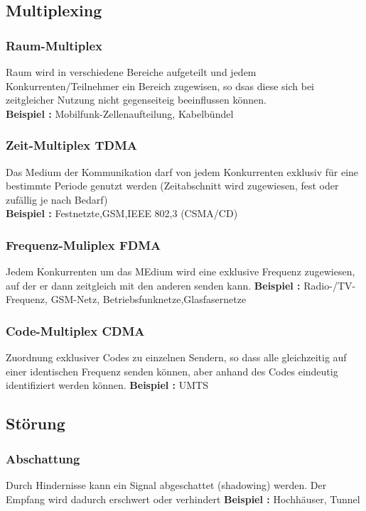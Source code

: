 \subsection{Multiplexing}
\subsubsection{Raum-Multiplex}
Raum wird in verschiedene Bereiche aufgeteilt und jedem Konkurrenten/Teilnehmer ein Bereich zugewisen, so dsas diese sich bei zeitgleicher Nutzung nicht gegenseiteig beeinflussen können. \\
\textbf{Beispiel :} Mobilfunk-Zellenaufteilung, Kabelbündel

\subsubsection{Zeit-Multiplex TDMA}
Das Medium der Kommunikation darf von jedem Konkurrenten exklusiv für eine bestimmte Periode genutzt werden (Zeitabschnitt wird zugewiesen, fest oder zufällig je nach Bedarf) \\
\textbf{Beispiel :} Festnetzte,GSM,IEEE 802,3 (CSMA/CD)

\subsubsection{Frequenz-Muliplex FDMA}
Jedem Konkurrenten um das MEdium wird eine exklusive Frequenz zugewiesen, auf der er dann zeitgleich mit den anderen senden kann.
\textbf{Beispiel :} Radio-/TV-Frequenz, GSM-Netz, Betriebsfunknetze,Glasfasernetze

\subsubsection{Code-Multiplex CDMA}
Zuordnung exklusiver Codes zu einzelnen Sendern, so dass alle gleichzeitig auf einer identischen Frequenz senden können, aber anhand des Codes eindeutig identifiziert werden können.
\textbf{Beispiel :} UMTS

\subsection{Störung}
\subsubsection{Abschattung}
Durch Hindernisse kann ein Signal abgeschattet (shadowing) werden. Der Empfang wird dadurch erschwert oder verhindert
\textbf{Beispiel :} Hochhäuser, Tunnel

